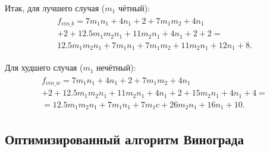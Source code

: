 Итак, для лучшего случая ($m_{1}$ чётный): 
\begin{eqnarray}
	\label{stand:best}
	\begin{aligned}
	f_{vin\_b} = 7m_{1}n_{1} + 4n_{1} + 2 + 7m_{1}m_{2} + 4n_{1}\\ + 2 + 12.5m_{1}m_{2}n_{1} + 11m_{2}n_{1} + 4n_{1} + 2 + 2 =\\ 
	 12.5m_{1}m_{2}n_{1} + 7m_{1}n_{1} + 7m_{1}m_{2} + 11m_{2}n_{1} + 12n_{1} + 8.
	\end{aligned}
\end{eqnarray}

Для худшего случая ($m_{1}$ нечётный): 
\begin{eqnarray}
	\label{stand:worst}
	\begin{aligned}
	f_{vin\_w} = 7m_{1}n_{1} + 4n_{1} + 2 + 7m_{1}m_{2} + 4n_{1}\\ + 2 + 12.5m_{1}m_{2}n_{1} + 11m_{2}n_{1} + 4n_{1} + 2 + 15m_{2}n_{1} + 4n_{1} + 4 =\\ = 12.5m_{1}m_{2}n_{1} + 7m_{1}n_{1} + 7m_{1}c + 26m_{2}n_{1} + 16n_{1} + 10.
	\end{aligned}
\end{eqnarray}

\subsection{Оптимизированный алгоритм Винограда}

